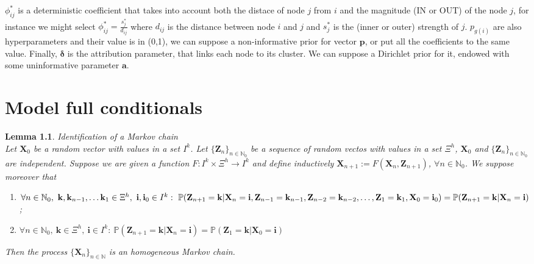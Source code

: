 \documentclass[11pt,twoside]{report}
\newtheorem{lemma}{Lemma}
\begin{document}
$ \phi_{ij}^* $ is a deterministic coefficient that takes into account both the distace of node $ j $ from $ i $ and the magnitude (IN or OUT) of the node $ j $, for instance we might select $ \phi_{ij}^*=\frac{s^*_j}{d_{ij}} $ where $ d_{ij} $ is the distance between node $ i $ and $ j $ and $ s_j^* $ is the (inner or outer) strength of $ j $. $ p_{g(i)} $ are also hyperparameters and their value is in (0,1), we can suppose a non-informative prior for vector $ \mathbf{p} $, or put all the coefficients to the same value. Finally, $ \boldsymbol{\delta} $ is the attribution parameter, that links each node to its cluster. We can suppose a Dirichlet prior for it, endowed with some uninformative parameter $ \mathbf{a} $. 

\appendix
\chapter{Model full conditionals}
\begin{lemma} Identification of a Markov chain\\
	Let $ \mathbf{X}_0 $ be a random vector with values in a set $ I^k $. Let $ \{\mathbf{Z}_n\}_{n\in\mathbb{N}_0}$ be a sequence
	of random vectos with values in a set $ \Xi^h $, $ \mathbf{X}_0 $ and $ \{\mathbf{Z}_n\}_{n\in\mathbb{N}_0}$ are independent.
	Suppose we are given a function
	$ F : I^k \times \Xi^h \rightarrow I^k $
	and define inductively
	$ \mathbf{X}_{n+1} := F (\mathbf{X}_n , \mathbf{Z}_{n+1} ) $, 
	$ \forall n \in \mathbb{N}_0 $.
	We suppose moreover that
	\begin{enumerate}
	\item $ \forall  n\in\mathbb{N}_0, \ \mathbf{k}, \mathbf{k}_{n-1} , \dots \mathbf{k}_1 \in \Xi^h,\ \mathbf{i}, \mathbf{i}_0 \in I^k:\\\ 
	\mathbb{P} (\mathbf{Z}_{n+1} = \mathbf{k}|\mathbf{X}_n = \mathbf{i}, \mathbf{Z}_{n-1} = \mathbf{k}_{n-1} , \mathbf{Z}_{n-2} = \mathbf{k}_{n-2} ,\dots, \mathbf{Z}_1 = \mathbf{k}_1 , \mathbf{X}_0 = \mathbf{i}_0 )
	=\\ \mathbb{P} (\mathbf{Z}_ {n+1} = \mathbf{k}|\mathbf{X}_n = \mathbf{i})$;
	\item $ \forall  n\in\mathbb{N}_0,\ \mathbf{k}\in \Xi^h,\ \mathbf{i} \in I^k:\ 
	\mathbb{P} (\mathbf{Z}_{n+1} = \mathbf{k}|\mathbf{X}_n = \mathbf{i}) = \mathbb{P} (\mathbf{Z}_1 = \mathbf{k}|\mathbf{X}_0 = \mathbf{i})$
\end{enumerate}
	Then the process $\{\mathbf{X}_n\}_{n\in\mathbb{N}}$ is an homogeneous Markov chain.
\end{lemma}
\end{document}
